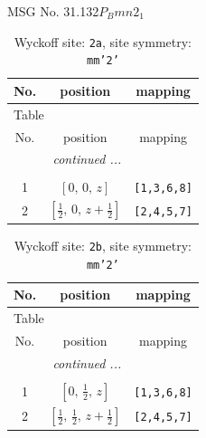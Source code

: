 \documentclass[fleqn,8pt]{jsarticle}
\begin{document}
\setcounter{MaxMatrixCols}{32}

\renewcommand{\tablename}{Table~}
\renewcommand{\figurename}{Figure~}
\begin{center}
\LARGE
MSG No. 31.132\quad$P_{B}mn2_{1}$
\end{center}
\renewcommand{\arraystretch}{1.2}
\begin{longtable}{ccc}
\caption{Wyckoff site: {\tt 2a}, site symmetry: {\tt mm'2'}}
 \\
 \hline \hline
No. & position & mapping \\ \hline \endfirsthead

\multicolumn{2}{l}{\tablename\ \thetable{}} \\
 \hline \hline
No. & position & mapping \\ \hline \endhead

 \hline \hline
\multicolumn{2}{r}{\footnotesize\it continued ...} \\ \endfoot

 \hline \hline
\multicolumn{2}{r}{} \\ \endlastfoot

1 & $\left[ 0,\, 0,\, z \right]$ & {\tt [1,3,6,8]} \\ \hline
2 & $\left[ \frac{1}{2},\, 0,\, z + \frac{1}{2} \right]$ & {\tt [2,4,5,7]} \\
\end{longtable}
\renewcommand{\arraystretch}{1.2}
\begin{longtable}{ccc}
\caption{Wyckoff site: {\tt 2b}, site symmetry: {\tt mm'2'}}
 \\
 \hline \hline
No. & position & mapping \\ \hline \endfirsthead

\multicolumn{2}{l}{\tablename\ \thetable{}} \\
 \hline \hline
No. & position & mapping \\ \hline \endhead

 \hline \hline
\multicolumn{2}{r}{\footnotesize\it continued ...} \\ \endfoot

 \hline \hline
\multicolumn{2}{r}{} \\ \endlastfoot

1 & $\left[ 0,\, \frac{1}{2},\, z \right]$ & {\tt [1,3,6,8]} \\ \hline
2 & $\left[ \frac{1}{2},\, \frac{1}{2},\, z + \frac{1}{2} \right]$ & {\tt [2,4,5,7]} \\
\end{longtable}
\end{document}
